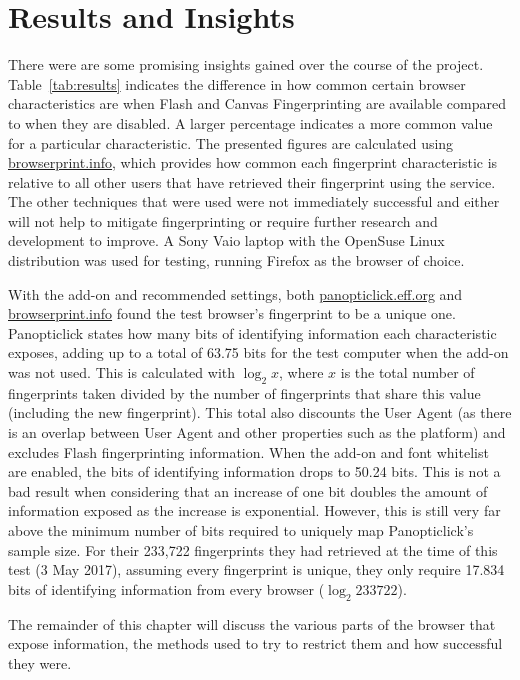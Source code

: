 \chapter{Results and Insights}

There were are some promising insights gained over the course of the project.
Table~\ref{tab:results} indicates the difference in how common certain browser characteristics are when Flash and Canvas Fingerprinting are available compared to when they are disabled.
A larger percentage indicates a more common value for a particular characteristic.
The presented figures are calculated using \url{browserprint.info}, which provides how common each fingerprint characteristic is relative to all other users that have retrieved their fingerprint using the service.
The other techniques that were used were not immediately successful and either will not help to mitigate fingerprinting or require further research and development to improve.
A Sony Vaio laptop with the OpenSuse Linux distribution was used for testing, running Firefox as the browser of choice.

With the add-on and recommended settings, both \url{panopticlick.eff.org} and \url{browserprint.info} found the test browser's fingerprint to be a unique one.
Panopticlick states how many bits of identifying information each characteristic exposes, adding up to a total of 63.75 bits for the test computer when the add-on was not used.
This is calculated with $\log_{2}x$, where $x$ is the total number of fingerprints taken divided by the number of fingerprints that share this value (including the new fingerprint).
This total also discounts the User Agent (as there is an overlap between User Agent and other properties such as the platform) and excludes Flash fingerprinting information.
When the add-on and font whitelist are enabled, the bits of identifying information drops to 50.24 bits.
This is not a bad result when considering that an increase of one bit doubles the amount of information exposed as the increase is exponential.
However, this is still very far above the minimum number of bits required to uniquely map Panopticlick's sample size.
For their 233,722 fingerprints they had retrieved at the time of this test (3 May 2017), assuming every fingerprint is unique, they only require 17.834 bits of identifying information from every browser ($\log_{2}233722$).

The remainder of this chapter will discuss the various parts of the browser that expose information, the methods used to try to restrict them and how successful they were.

